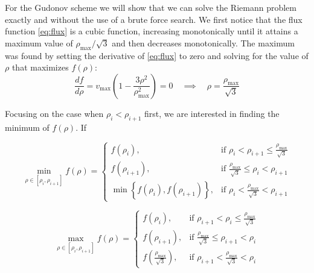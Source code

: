 \documentclass[11pt]{article}
\begin{document}
For the Gudonov scheme we will show that we can solve the Riemann problem exactly and without the use of a brute force search. We first notice that the flux function \eqref{eq:flux} is a cubic function, increasing monotonically until it attains a maximum value of $\rho_\mathrm{max}/\sqrt{3}$ and then decreases monotonically. The maximum was found by setting the derivative of \eqref{eq:flux} to zero and solving for the value of $\rho$ that maximizes $f(\rho)$:
\begin{equation*}
  \frac{df}{d\rho} = v_\mathrm{max} \left( 1 - \frac{3\rho^2}{\rho_\mathrm{max}^2} \right) = 0 \quad \implies \quad \rho = \frac{\rho_\mathrm{max}}{\sqrt{3}}
\end{equation*}

Focusing on the case when $\rho_i < \rho_{i+1}$ first, we are interested in finding the minimum of $f(\rho)$. If 

\begin{equation}
\min_{\rho \in \left[\rho_i, \rho_{i+1}\right]} f(\rho) =
\begin{cases}
  f(\rho_i),&
    \text{if } \rho_i < \rho_{i+1} \le \frac{\rho_\mathrm{max}}{\sqrt{3}} \\
  f(\rho_{i+1}),&
    \text{if } \frac{\rho_\mathrm{max}}{\sqrt{3}} \le \rho_i < \rho_{i+1} \\
  \min\left\{ f(\rho_i), f(\rho_{i+1}) \right\} ,&
    \text{if } \rho_i < \frac{\rho_\mathrm{max}}{\sqrt{3}} < \rho_{i+1}
\end{cases}
\end{equation}

\begin{equation}
\max_{\rho \in \left[\rho_i, \rho_{i+1}\right]} f(\rho) =
\begin{cases}
  f(\rho_i),&
    \text{if } \rho_{i+1} < \rho_i \le \frac{\rho_\mathrm{max}}{\sqrt{3}} \\
  f(\rho_{i+1}),&
    \text{if } \frac{\rho_\mathrm{max}}{\sqrt{3}} \le \rho_{i+1} < \rho_i \\
  f\left( \frac{\rho_\mathrm{max}}{\sqrt{3}} \right) ,&
  \text{if } \rho_{i+1} < \frac{\rho_\mathrm{max}}{\sqrt{3}} < \rho_i
\end{cases}
\end{equation}
\end{document}
